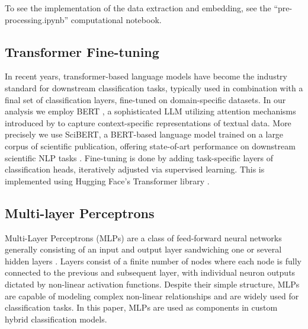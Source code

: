 To see the implementation of the data extraction and embedding, see the
``pre-processing.ipynb'' computational notebook.


\subsection{Transformer Fine-tuning}
In recent years, transformer-based language models have become the industry standard for downstream classification tasks, typically used in combination with a final set of classification layers, fine-tuned on domain-specific datasets. In our analysis we employ BERT \parencite{devlin2019bertpretrainingdeepbidirectional}, a sophisticated LLM utilizing attention mechanisms introduced by \textcite{vaswani2023attentionneed} to capture context-specific representations of textual data. More precisely we use SciBERT, a BERT-based language model trained on a large corpus of scientific publication, offering state-of-art performance on downstream scientific NLP tasks \autocite{Beltagy2019SciBERTAP}. Fine-tuning is done by adding task-specific layers of classification heads, iteratively adjusted via supervised learning. This is implemented using Hugging Face's Transformer library \parencite{wolf-etal-2020-transformers}.

\subsection{Multi-layer Perceptrons}
Multi-Layer Perceptrons (MLPs) are a class of feed-forward neural networks generally consisting of an input and output layer sandwiching one or several hidden layers \autocite{HORNIK1989359}. Layers consist of a finite number of nodes where each node is fully connected to the previous and subsequent layer, with individual neuron outputs dictated by non-linear activation functions. Despite their simple structure, MLPs are capable of modeling complex non-linear relationships \autocite{HORNIK1989359} and are widely used for classification tasks. In this paper, MLPs are used as components in custom hybrid classification models.